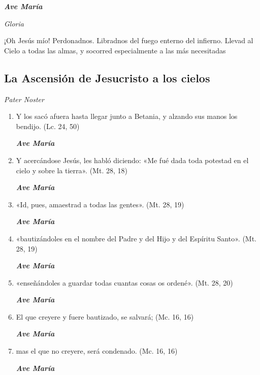 \documentclass[a4paper,11pt, oneside]{report}
\begin{document}
      \textbf{\textit{Ave María}}\par
      \indent\textit{Gloria}\par
      \indent¡Oh Jesús mío! Perdonadnos. Libradnos del fuego enterno del infierno. Llevad al Cielo a todas las almas, y socorred especialmente a las más 
      necesitadas

    \subsection*{ La Ascensión de Jesucristo a los cielos }
        
      \textit{Pater Noster}

      \begin{enumerate} 

        \item Y los sacó afuera hasta llegar junto a Betania, y alzando sus manos los bendijo. (Lc. 24, 50)

        \textbf{\textit{Ave María}}

        \item Y acercándose Jesús, les habló diciendo: «Me fué dada toda potestad en el cielo y sobre la tierra». (Mt. 28, 18)

        \textbf{\textit{Ave María}}

        \item «Id, pues, amaestrad a todas las gentes». (Mt. 28, 19)

        \textbf{\textit{Ave María}}

        \item «bautizándoles en el nombre del Padre y del Hijo y del Espíritu Santo». (Mt. 28, 19)

        \textbf{\textit{Ave María}}

        \item «enseñándoles a guardar todas cuantas cosas os ordené». (Mt. 28, 20)

        \textbf{\textit{Ave María}}

        \item El que creyere y fuere bautizado, se salvará; (Mc. 16, 16)

        \textbf{\textit{Ave María}}

        \item mas el que no creyere, será condenado. (Mc. 16, 16)

        \textbf{\textit{Ave María}}


\end{enumerate}
\end{document}
